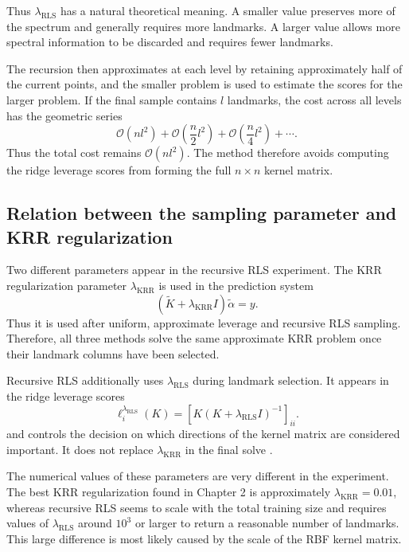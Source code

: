 Thus $\lambda_{\mathrm{RLS}}$ has a natural theoretical meaning. A smaller value preserves more of the spectrum and generally requires more landmarks. A larger value allows more spectral information to be discarded and requires fewer landmarks.

The recursion then approximates at each level by retaining approximately half of the current points, and the smaller problem is used to estimate the scores for the larger problem. If the final sample contains $l$ landmarks, the cost across all levels has the geometric series
\[
\mathcal{O}\left(nl^2\right) + \mathcal{O}\left(\frac{n}{2}l^2\right) + \mathcal{O}\left(\frac{n}{4}l^2\right) +\cdots.
\]
Thus the total cost remains $\mathcal{O}(nl^2).$ The method therefore avoids computing the ridge leverage scores from forming the full $n\times n$ kernel matrix.

\subsection{Relation between the sampling parameter and KRR regularization}

Two different parameters appear in the recursive RLS experiment. The KRR regularization
parameter $\lambda_{\mathrm{KRR}}$ is used in the prediction system
\[
(\widetilde K+\lambda_{\mathrm{KRR}}I)\widetilde\alpha=y.
\]
Thus it is used after uniform, approximate leverage and recursive RLS sampling. Therefore, all three methods solve the same approximate KRR problem once their landmark columns have been selected.

Recursive RLS additionally uses $\lambda_{\mathrm{RLS}}$ during landmark selection. It appears in the ridge leverage scores
\[
\ell_i^{\lambda_{\mathrm{RLS}}}(K) = [ K(K+\lambda_{\mathrm{RLS}}I)^{-1} ]_{ii}.
\]
and controls the decision on which directions of the kernel matrix are considered important. It does not replace $\lambda_{\mathrm{KRR}}$ in the final solve \citep{alaoui2015fast,musco2017recursive}. 

The numerical values of these parameters are very different in the experiment. The best
KRR regularization found in Chapter 2 is approximately $\lambda_{\mathrm{KRR}}=0.01$, whereas recursive RLS seems to scale with the total training size and requires values of $\lambda_{\mathrm{RLS}}$ around $10^3$ or larger to return a reasonable number of landmarks. This large difference is most likely caused by the scale of the RBF kernel matrix.

